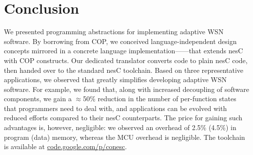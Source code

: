 \section{Conclusion}\label{sec:ending}

We presented programming abstractions for implementing adaptive WSN
software. By borrowing from COP, we conceived language-independent
design concepts mirrored in a concrete language
implementation---\conesc---that extends nesC with COP constructs. Our
dedicated translator converts \conesc code to plain nesC code, then
handed over to the standard nesC toolchain. Based on three
representative applications, we observed that \conesc greatly
simplifies developing adaptive WSN software. For example, we found
that, along with increased decoupling of software components, we gain
a $\approx$50\% reduction in the number of per-function states that
programmers need to deal with, and applications can be evolved with
reduced efforts compared to their nesC counterparts. The price for
gaining such advantages is, however, negligible: we observed an
overhead of 2.5\% (4.5\%) in program (data) memory, whereas the MCU
overhead is negligible. The \conesc toolchain is available at
\url{code.google.com/p/conesc}.





